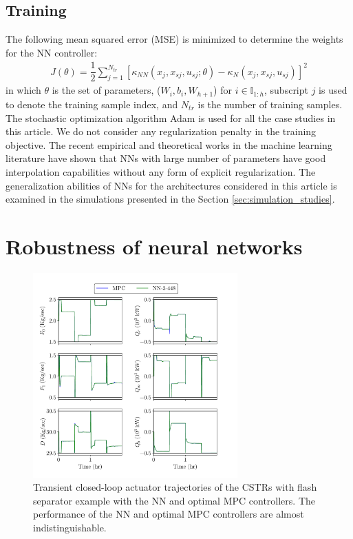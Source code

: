 \documentclass[preprint,5p, twocolumn, authoryear]{elsarticle}
\newcommand{\bbI}{\mathbb{I}}
\begin{document}
\subsection{Training}

The following mean squared error (MSE) is minimized to determine the weights for
the NN controller:
\begin{align}
    J (\theta) = \dfrac{1}{2}\sum_{j=1}^{N_{tr}} 
[\kappa_{NN}(x_j, x_{sj}, u_{sj}; \theta) - \kappa_N(x_j, x_{sj}, u_{sj})]^2 
\end{align}
in which $\theta$ is the set of parameters, ($W_i, b_i, W_{h+1}$) for $i \in
\bbI_{1:h}$, subscript $j$ is used to denote the training sample index, and
$N_{tr}$ is the number of training samples. The stochastic optimization
algorithm Adam \citep{kingma:ba:2014} is used for all the case studies in this
article. We do not consider any regularization penalty in the training
objective. The recent empirical and theoretical works in the machine learning
literature have shown that NNs with large number of parameters have good
interpolation capabilities \citep{belkin:hsu:ma:mandal:2019,
zhang:bengio:hardt:recht:vinyals:2017, arora:simon:hu:li:wang:2019,
allen-zhu:li:liang:2019} without any form of explicit regularization. The
generalization abilities of NNs for the architectures considered in this article
is examined in the simulations presented in the Section
\ref{sec:simulation_studies}.

\section{Robustness of neural networks} \label{sec:robustness}

\begin{figure}[!h]
    \centering
	\includegraphics[page=1, width=0.7\textwidth,
		height=0.46\textheight]{cstrs_comparision_plots.pdf}    
        \caption{Transient closed-loop actuator trajectories of the CSTRs with
        flash separator example with the NN and optimal MPC controllers. The
        performance of the NN and optimal MPC controllers are almost
        indistinguishable.}   
    \label{fig:cl_cstrs_inputs}
\end{figure}
\end{document}
